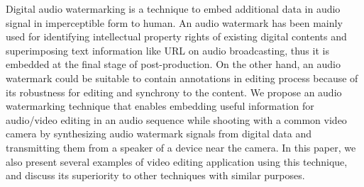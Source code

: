 \begin{eabstract}
Digital audio watermarking is a technique to embed additional data in audio signal in imperceptible form to human.
An audio watermark has been mainly used for identifying intellectual property rights of existing digital contents and superimposing text information like URL on audio broadcasting, thus it is embedded at the final stage of post-production.
On the other hand, an audio watermark could be suitable to contain annotations in editing process because of its robustness for editing and synchrony to the content.
We propose an audio watermarking technique that enables embedding useful information for audio/video editing in an audio sequence while shooting with a common video camera by synthesizing audio watermark signals from digital data and transmitting them from a speaker of a device near the camera.
In this paper, we also present several examples of video editing application using this technique, and discuss its superiority to other techniques with similar purposes.
\end{eabstract}
